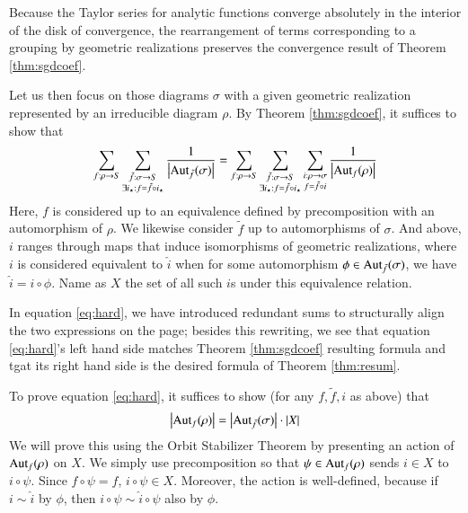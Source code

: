 \documentclass{article}
\theoremstyle{plain}
\theoremstyle{definition}
\newcommand{\wabs}[1]{\left|#1\right|}
\newcommand{\Aut}{\text{\textnormal{Aut}}}
\begin{document}
            Because the Taylor series for analytic functions converge
            absolutely in the interior of the disk of convergence, the
            rearrangement of terms corresponding to a grouping by geometric
            realizations preserves the convergence result of Theorem
            \ref{thm:sgdcoef}.  

            Let us then focus on those diagrams $\sigma$ with a given geometric
            realization represented by an irreducible diagram $\rho$.  By
            Theorem \ref{thm:sgdcoef}, it suffices to show that
            \begin{equation} \label{eq:hard}
                \sum_{f:\rho\to S}
                \sum_{\substack{
                    \tilde f:\sigma\to S \\
                    \exists i_\star: f=\tilde f \circ i_\star
                }}
                \frac{1}{\wabs{\Aut_{\tilde f}(\sigma)}}
                =
                \sum_{f:\rho\to S}
                \sum_{\substack{
                    \tilde f:\sigma\to S \\
                    \exists i_\star: f=\tilde f \circ i_\star
                }}
                \sum_{\substack{
                    i:\rho\to\sigma \\
                    f = \tilde f \circ i
                }}
                \frac{1}{\wabs{\Aut_{f}(\rho)}}
            \end{equation}
            Here, $f$ is considered up to an equivalence defined by
            precomposition with an automorphism of $\rho$.  We likewise
            consider $\tilde f$ up to automorphisms of $\sigma$.  And above,
            $i$ ranges through maps that induce isomorphisms of geometric
            realizations, where $i$ is considered equivalent to $\hat i$ when
            for some automorphism $\phi \in \Aut_{\tilde f}(\sigma)$, we have
            $\hat i = i \circ \phi$.  Name as $X$ the set of all such $i$s
            under this equivalence relation.

            In equation \ref{eq:hard}, we have introduced
            redundant sums to structurally align the two expressions on the
            page; besides this rewriting, we see that equation \ref{eq:hard}'s
            left hand side matches Theorem \ref{thm:sgdcoef} resulting formula
            and tgat its right hand side is the desired formula of Theorem
            \ref{thm:resum}. 

            To prove equation \ref{eq:hard}, it suffices to show (for any
            $f, \tilde f, i$ as above) that
            $$
                \wabs{\Aut_f(\rho)}
                =
                \wabs{\Aut_{\tilde f}(\sigma)}
                \cdot
                \wabs{X}
            $$
            We will prove this using the Orbit Stabilizer Theorem by presenting
            an action of $\Aut_f(\rho)$ on $X$.  We simply use precomposition
            so that $\psi\in \Aut_f(\rho)$ sends $i\in X$ to $i\circ \psi$.
            Since $f\circ\psi = f$, $i\circ \psi \in X$.  Moreover, the action
            is well-defined, because if $i\sim \hat i$ by $\phi$, then $i \circ
            \psi \sim \hat i \circ \psi$ also by $\phi$.
            
\end{document}
